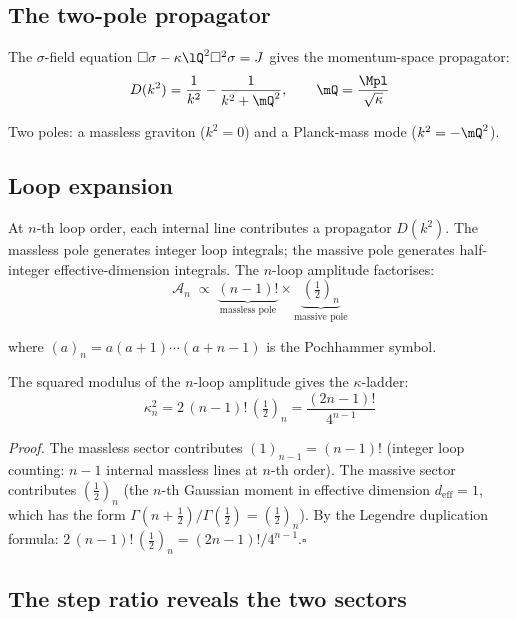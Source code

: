 \subsection{The two-pole propagator}

The $\sigma$-field equation $\Box\sigma - \kappa\lQ^2\Box^2\sigma = J$ gives the momentum-space propagator:
\begin{equation}
  D(k^2) = \frac{1}{k^2} - \frac{1}{k^2 + \mQ^2}, \qquad \mQ = \frac{\Mpl}{\sqrt\kappa}
\end{equation}

Two poles: a massless graviton ($k^2 = 0$) and a Planck-mass mode ($k^2 = -\mQ^2$).

\subsection{Loop expansion}

At $n$-th loop order, each internal line contributes a propagator $D(k^2)$.  The massless pole generates integer loop integrals; the massive pole generates half-integer effective-dimension integrals.  The $n$-loop amplitude factorises:
\begin{equation}
  \mathcal{A}_n \;\propto\; \underbrace{(n-1)!}_{\text{massless pole}} \times \underbrace{\left(\tfrac{1}{2}\right)_n}_{\text{massive pole}}
\end{equation}

where $(a)_n = a(a+1)\cdots(a+n-1)$ is the Pochhammer symbol.

\begin{theorem}
  The squared modulus of the $n$-loop amplitude gives the $\kappa$-ladder:
  \begin{equation}
    \kappa_n^2 = 2\,(n-1)!\,\left(\tfrac{1}{2}\right)_n = \frac{(2n-1)!}{4^{n-1}}
  \end{equation}
\end{theorem}

\emph{Proof.}  The massless sector contributes $(1)_{n-1} = (n-1)!$ (integer loop counting: $n-1$ internal massless lines at $n$-th order).  The massive sector contributes $(\frac{1}{2})_n$ (the $n$-th Gaussian moment in effective dimension $d_{\mathrm{eff}} = 1$, which has the form $\Gamma(n+\frac{1}{2})/\Gamma(\frac{1}{2}) = (\frac{1}{2})_n$).  By the Legendre duplication formula: $2\,(n-1)!\,(\frac{1}{2})_n = (2n-1)!/4^{n-1}$.\hfill$\square$

\subsection{The step ratio reveals the two sectors}

